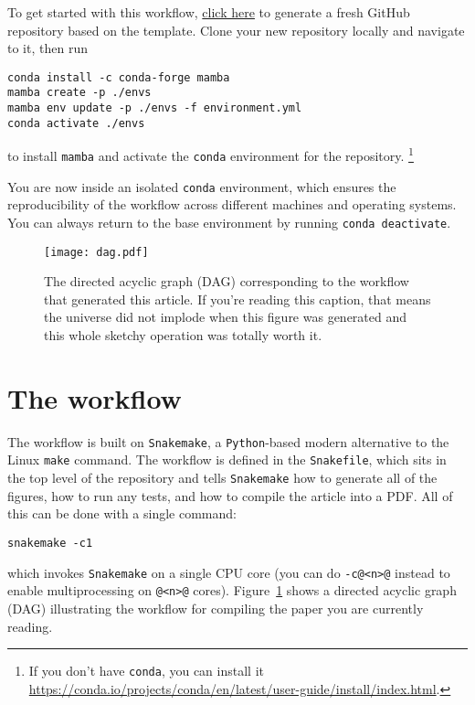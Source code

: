 \documentclass[modern]{aastex62}
\begin{document}
To get started with this workflow, \href{https://github.com/rodluger/showyourwork/generate}{click here} to generate a fresh GitHub repository based on the \showyourwork template.
Clone your new repository locally and navigate to it, then run
%
\begin{lstlisting}[style=bash]
conda install -c conda-forge mamba
mamba create -p ./envs
mamba env update -p ./envs -f environment.yml
conda activate ./envs
\end{lstlisting}
%
to install \texttt{mamba} and activate the \texttt{conda} environment for the repository.%
\footnote{If you don't have \texttt{conda}, you can install it \href{here}{https://conda.io/projects/conda/en/latest/user-guide/install/index.html}.}

You are now inside an isolated \texttt{conda} environment, which ensures the reproducibility of the workflow across different machines and operating systems. You can always return to the base environment by running \lstinline[style=bash]!conda deactivate!.

\begin{figure}[t!]
    \begin{centering}
        \texttt{[image: dag.pdf]}
        \caption{
            The directed acyclic graph (DAG) corresponding to the workflow that generated this article.
            If you're reading this caption, that means the universe did not implode when this figure was generated and this whole sketchy operation was totally worth it.
        }
        \label{fig:dag}
    \end{centering}
\end{figure}

\clearpage
\section{The workflow}

The \showyourwork workflow is built on \texttt{Snakemake}, a \texttt{Python}-based modern alternative to the Linux \texttt{make} command.
The workflow is defined in the \texttt{Snakefile}, which sits in the top level of the repository and tells \texttt{Snakemake} how to generate all of the figures, how to run any tests, and how to compile the article into a PDF.
All of this can be done with a single command:
%
\begin{lstlisting}[style=bash]
snakemake -c1
\end{lstlisting}
%
which invokes \texttt{Snakemake} on a single CPU core (you can do \lstinline[style=bash]!-c@<n>@! instead to enable multiprocessing on \lstinline[style=bash]!@<n>@! cores). Figure~\ref{fig:dag} shows a directed acyclic graph (DAG) illustrating the workflow for compiling the paper you are currently reading.
\end{document}
